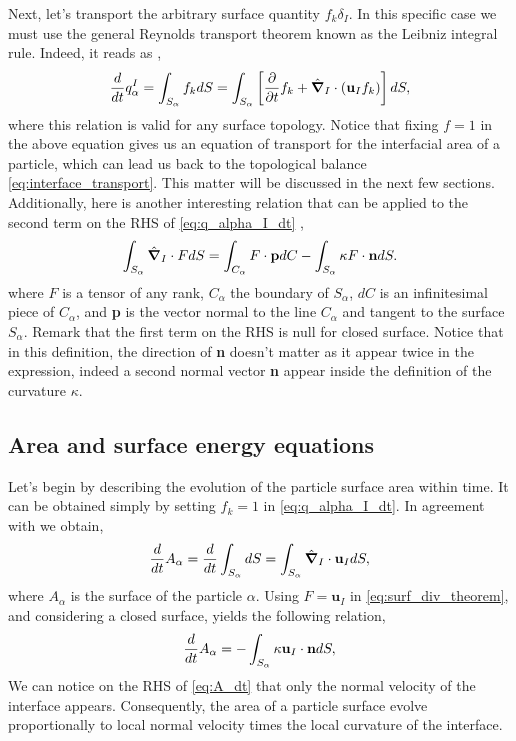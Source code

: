 Next, let's transport the arbitrary surface quantity $f_k \delta_I$.
In this specific case we must use the general Reynolds transport theorem known as the Leibniz integral rule. 
Indeed, it reads as \citep[Appendix B]{morel2015mathematical}, 
\begin{equation}
    \frac{d}{d t}  q^I_\alpha
    = \int_{S_\alpha} f_k dS 
    = \int_{S_\alpha} \left[
        \frac{\partial}{\partial t} f_k 
        +   \hat{\bm{\nabla}}_I \cdot (\textbf{u}_If_k)
    \right]dS,
    \label{eq:q_alpha_I_dt}
\end{equation}
where this relation is valid for any surface topology. 
Notice that fixing $f=1$ in the above equation gives us an equation of transport for the interfacial area of a particle, which can lead us back to the topological balance \ref{eq:interface_transport}. 
This matter will be discussed in the next few sections. 
Additionally, here is another interesting relation that can be applied to the second term on the RHS of \ref{eq:q_alpha_I_dt} \citep[Appendix B]{tryggvason2011direct}, 
\begin{equation}
    \int_{S_\alpha}  \hat{\bm{\nabla}}_I  \cdot F dS
    = \int_{C_\alpha} F \cdot \textbf{p} dC
    - \int_{S_\alpha} \kappa F \cdot \textbf{n} dS. 
    \label{eq:surf_div_theorem}
\end{equation}
where $F$ is a tensor of any rank, $C_\alpha$ the boundary of $S_\alpha$, $dC$ is an infinitesimal piece of $C_\alpha$, and \textbf{p} is the vector normal to the line $C_\alpha$ and tangent to the surface $S_\alpha$.
Remark that the first term on the RHS is null for closed surface. 
Notice that in this definition, the direction of \textbf{n} doesn't matter as it appear twice in the expression, indeed a second normal vector \textbf{n} appear inside the definition of the curvature $\kappa$. 

\subsection{Area and surface energy equations}

Let's begin by describing the evolution of the particle surface area within time.
It can be obtained simply by setting $f_k = 1$ in \ref{eq:q_alpha_I_dt}.  
In agreement with \citet{morel2007surface} we obtain,  
\begin{equation*}
    \frac{d}{d t} A_\alpha
    = \frac{d}{d t} \int_{S_\alpha} dS
    = \int_{S_\alpha} \hat{\bm{\nabla}}_I \cdot \textbf{u}_I dS,
\end{equation*}
where $A_\alpha$ is the surface of the particle $\alpha$. 
Using $F = \textbf{u}_I$ in \ref{eq:surf_div_theorem}, and considering a closed surface, yields the following relation, 
\begin{equation}
    \frac{d}{d t} A_\alpha
    = - \int_{S_\alpha} \kappa \textbf{u}_I \cdot \textbf{n} dS,
    \label{eq:A_dt}
\end{equation}
We can notice on the RHS of \ref{eq:A_dt} that only the normal velocity of the interface appears.
Consequently, the area of a particle surface evolve proportionally to local normal velocity times the local curvature of the interface. 

